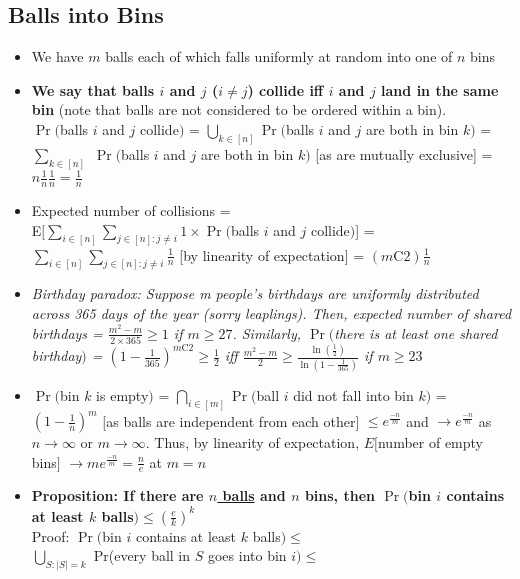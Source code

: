 \documentclass[20pt,a4paper,landscape]{extarticle}
\begin{document}
\begin{flushleft}
\subsection{Balls into Bins}
\begin{itemize}
\item We have $m$ balls each of which falls uniformly at random into one of $n$ bins
\item \textbf{We say that balls $i$ and $j$ ($i \neq j$) collide iff $i$ and $j$ land in the same bin} (note that balls are not considered to be ordered within a bin).\\
$\Pr($balls $i$ and $j$ collide$)$ = $\bigcup_{k \in [n]} \Pr($balls $i$ and $j$ are both in bin $k)$ = $\sum_{k \in [n]}$ $\Pr($balls $i$ and $j$ are both in bin $k)$ [as are mutually exclusive] = $n\frac{1}{n}\frac{1}{n}= \frac{1}{n}$
\item Expected number of collisions =\\
E$[\sum_{i \in [n]} \sum_{j \in [n]: j \neq i} 1\times\Pr($balls $i$ and $j$ collide$)$] =\\
$\sum_{i \in [n]} \sum_{j \in [n]: j \neq i} \frac{1}{n}$ [by linearity of expectation] = $\left(m\textrm{C}2\right)\frac{1}{n}$
\clearpage
\item \textit{Birthday paradox: Suppose m people's birthdays are uniformly distributed across 365 days of the year (sorry leaplings). Then, expected number of shared birthdays = $\frac{m^2 - m}{2\times365} \geq 1$ if $m \geq 27$. Similarly, $\Pr($there is at least one shared birthday$)$ = $\left(1-\frac{1}{365}\right)^{m\textrm{C}2} \geq \frac{1}{2}$ iff $\frac{m^2-m}{2} \geq \frac{\ln\left(\frac{1}{2}\right)}{\ln\left(1 - \frac{1}{365}\right)}$ if $m \geq 23$}
\item $\Pr($bin $k$ is empty$)$ = $\bigcap_{i \in [m]} \Pr($ball $i$ did not fall into bin $k)$ = $(1-\frac{1}{n})^m$ [as balls are independent from each other] $\leq e^\frac{-n}{m}$ and $\rightarrow e^\frac{-n}{m}$ as $n \rightarrow \infty$ or $m \rightarrow \infty$. Thus, by linearity of expectation, $E[$number of empty bins$]$ $\rightarrow me^\frac{-n}{m} = \frac{n}{e}$ at $m=n$
\item \textbf{Proposition: If there are \underline{$n$ balls} and $n$ bins, then $\Pr($bin $i$ contains at least $k$ balls$) \leq \left(\frac{e}{k}\right)^k$}\\
Proof: $\Pr($bin $i$ contains at least $k$ balls$) \leq$\\
$\bigcup_{S: |S| = k}$ Pr(every ball in $S$ goes into bin $i)\leq$\\

\end{itemize}
\end{flushleft}
\end{document}
